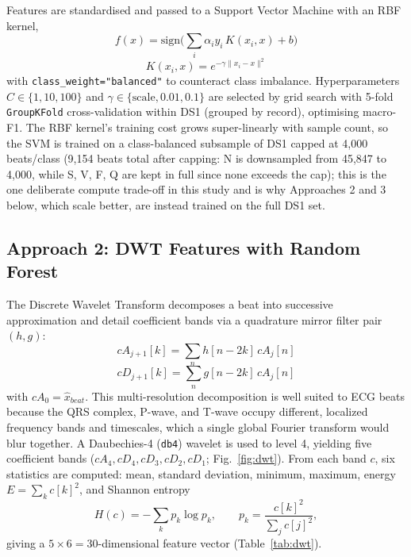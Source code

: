 \documentclass[conference]{IEEEtran}
\begin{document}
Features are standardised and passed to a Support Vector
Machine with an RBF kernel,
\begin{equation}
f(x) = \mathrm{sign}\Big(\sum_{i} \alpha_i y_i \, K(x_i, x) + b\Big)
\end{equation}
\begin{equation}
K(x_i,x) = e^{-\gamma\|x_i - x\|^2}
\end{equation}
with \texttt{class\_weight="balanced"} to counteract class imbalance.
Hyperparameters $C \in \{1,10,100\}$ and $\gamma \in \{\text{scale},
0.01, 0.1\}$ are selected by grid search with 5-fold \texttt{GroupKFold}
cross-validation within DS1 (grouped by record), optimising macro-F1. The
RBF kernel's training cost grows super-linearly with sample count, so the
SVM is trained on a class-balanced subsample of DS1 capped at 4{,}000
beats/class (9{,}154 beats total after capping: N is downsampled from
45{,}847 to 4{,}000, while S, V, F, Q are kept in full since none exceeds
the cap); this is the one deliberate compute trade-off in this study and
is why Approaches 2 and 3 below, which scale better, are instead trained
on the full DS1 set.

\subsection{Approach 2: DWT Features with Random Forest}

The Discrete Wavelet Transform decomposes a beat into successive
approximation and detail coefficient bands via a quadrature mirror filter
pair $(h,g)$:
\begin{equation}
cA_{j+1}[k] = \sum_n h[n-2k]\,cA_j[n]
\end{equation}
\begin{equation}
cD_{j+1}[k] = \sum_n g[n-2k]\,cA_j[n]
\end{equation}
with $cA_0 = \hat{x}_{beat}$. This multi-resolution decomposition is
well suited to ECG beats because the QRS complex, P-wave, and T-wave
occupy different, localized frequency bands and timescales, which a
single global Fourier transform would blur together. A Daubechies-4
(\texttt{db4}) wavelet is used to level 4, yielding five coefficient bands
($cA_4, cD_4, cD_3, cD_2, cD_1$; Fig.~\ref{fig:dwt}). From each band $c$,
six statistics are computed: mean, standard deviation, minimum, maximum,
energy $E=\sum_k c[k]^2$, and Shannon entropy
\begin{equation}
H(c) = -\sum_k p_k \log p_k, \qquad p_k = \frac{c[k]^2}{\sum_j c[j]^2},
\end{equation}
giving a $5 \times 6 = 30$-dimensional feature vector (Table~\ref{tab:dwt}).
\end{document}
